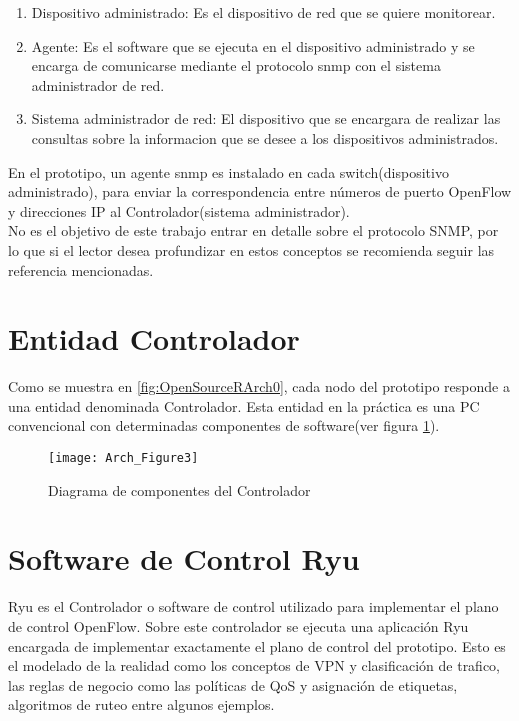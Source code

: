 \begin{enumerate}

\item Dispositivo administrado: Es el dispositivo de red que se quiere monitorear.

\item Agente: Es el software que se ejecuta en el dispositivo administrado y se encarga de comunicarse mediante el protocolo snmp con el sistema administrador de red.

\item Sistema administrador de red: El dispositivo que se encargara de realizar las consultas sobre la informacion que se desee a los dispositivos administrados.

\end{enumerate}	

En el prototipo, un agente snmp es instalado en cada switch(dispositivo administrado), para enviar la correspondencia entre números de puerto OpenFlow y direcciones IP al Controlador(sistema administrador).\\

No es el objetivo de este trabajo entrar en detalle sobre el protocolo SNMP, por lo que si el lector desea profundizar en estos conceptos se recomienda seguir las referencia mencionadas.\\

\section{Entidad Controlador}
Como se muestra en \ref{fig:OpenSourceRArch0}, cada nodo del prototipo responde a una entidad denominada Controlador. Esta entidad en la pr\'actica es una PC convencional con determinadas componentes de software(ver figura \ref{fig:OpenSourceRArch3}).\\

\begin{figure}[htbp!] 
\centering    
\texttt{[image: Arch\_Figure3]}
\caption[OpenSourceRArch3]{Diagrama de componentes del Controlador}
\label{fig:OpenSourceRArch3}
\end{figure}

\section{Software de Control Ryu}
Ryu es el Controlador o software de control utilizado para implementar el plano de control OpenFlow. Sobre este controlador se ejecuta una aplicación Ryu encargada de implementar exactamente el plano de control del prototipo. Esto es el modelado de la realidad como los conceptos de VPN y clasificación de trafico, las reglas de negocio como las políticas de QoS y asignación de etiquetas, algoritmos de ruteo entre algunos ejemplos. 

